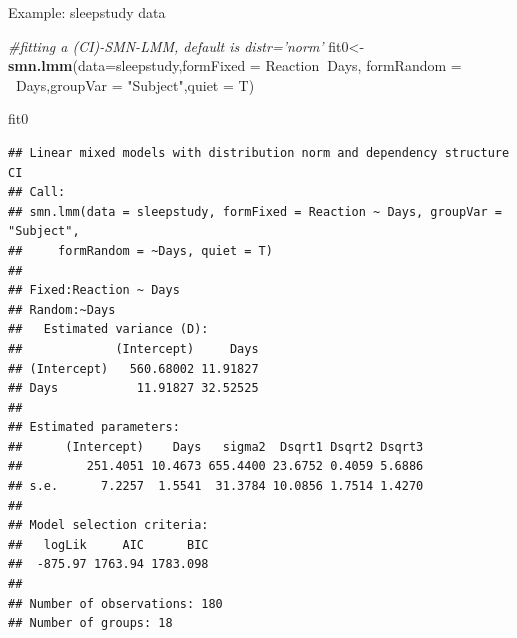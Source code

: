 \documentclass[
  ignorenonframetext,
]{beamer}
\newenvironment{Shaded}{\begin{snugshade}}{\end{snugshade}}
\newcommand{\CommentTok}[1]{\textcolor[rgb]{0.56,0.35,0.01}{\textit{#1}}}
\newcommand{\DataTypeTok}[1]{\textcolor[rgb]{0.13,0.29,0.53}{#1}}
\newcommand{\KeywordTok}[1]{\textcolor[rgb]{0.13,0.29,0.53}{\textbf{#1}}}
\newcommand{\NormalTok}[1]{#1}
\newcommand{\OperatorTok}[1]{\textcolor[rgb]{0.81,0.36,0.00}{\textbf{#1}}}
\newcommand{\StringTok}[1]{\textcolor[rgb]{0.31,0.60,0.02}{#1}}
\begin{document}
\begin{frame}[fragile]{Example: sleepstudy data}
\protect\hypertarget{example-sleepstudy-data}{}

\tiny

\begin{Shaded}
\begin{Highlighting}[]
\CommentTok{#fitting a (CI)-SMN-LMM, default is distr='norm'}
\NormalTok{fit0<-}\KeywordTok{smn.lmm}\NormalTok{(}\DataTypeTok{data=}\NormalTok{sleepstudy,}\DataTypeTok{formFixed =}\NormalTok{ Reaction}\OperatorTok{~}\NormalTok{Days,}
              \DataTypeTok{formRandom =} \OperatorTok{~}\NormalTok{Days,}\DataTypeTok{groupVar =} \StringTok{"Subject"}\NormalTok{,}\DataTypeTok{quiet =}\NormalTok{ T)}
\end{Highlighting}
\end{Shaded}

\begin{Shaded}
\begin{Highlighting}[]
\NormalTok{fit0}
\end{Highlighting}
\end{Shaded}

\begin{verbatim}
## Linear mixed models with distribution norm and dependency structure CI 
## Call:
## smn.lmm(data = sleepstudy, formFixed = Reaction ~ Days, groupVar = "Subject", 
##     formRandom = ~Days, quiet = T)
## 
## Fixed:Reaction ~ Days
## Random:~Days
##   Estimated variance (D):
##             (Intercept)     Days
## (Intercept)   560.68002 11.91827
## Days           11.91827 32.52525
## 
## Estimated parameters:
##      (Intercept)    Days   sigma2  Dsqrt1 Dsqrt2 Dsqrt3
##         251.4051 10.4673 655.4400 23.6752 0.4059 5.6886
## s.e.      7.2257  1.5541  31.3784 10.0856 1.7514 1.4270
## 
## Model selection criteria:
##   logLik     AIC      BIC
##  -875.97 1763.94 1783.098
## 
## Number of observations: 180 
## Number of groups: 18
\end{verbatim}

\end{frame}
\end{document}
